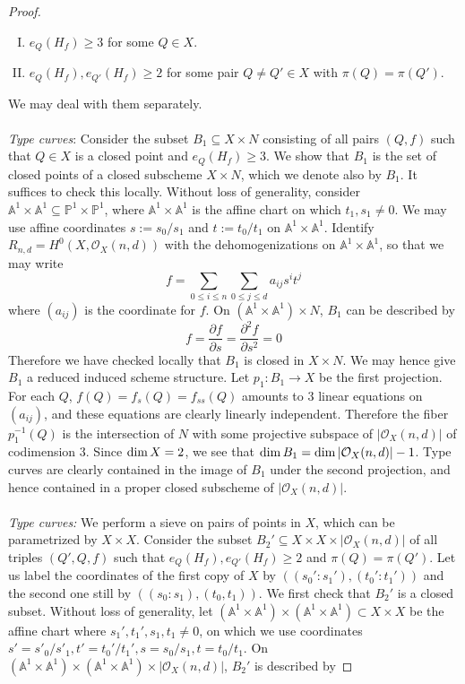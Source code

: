 \documentclass[12pt]{article}
\theoremstyle{plain}
\theoremstyle{definition}
\newcommand{\IA}{\mathbb{A}}
\newcommand{\IP}{\mathbb{P}}
\newcommand{\sO}{\mathcal{O}}
\renewcommand\dim{{\rm dim\,}}
\newcommand{\<}{\langle}
\renewcommand{\>}{\rangle}
\newcommand{\p}{\partial}
\begin{document}
\begin{proof}
\begin{enumerate}[I.]
\item $e_Q(H_f) \ge 3$ for some $Q \in X$. 
\item $e_{Q}(H_f), e_{Q'}(H_f) \ge 2$ for some pair $Q \neq Q' \in X$ with $\pi(Q) = \pi(Q')$. 
\end{enumerate}
We may deal with them separately. \\\\
\textit{Type \uppercase\expandafter{} curves}: Consider the subset $B_1 \subseteq X \times N$ consisting of all pairs $(Q, f)$ such that $Q \in X$ is a closed point and $e_Q(H_f) \ge 3$. We show that $B_1$ is the set of closed points of a closed subscheme $X \times N$, which we denote also by $B_1$. It suffices to check this locally. Without loss of generality, consider $\IA^1 \times \IA^1 \subseteq \IP^1 \times \IP^1$, where $\IA^1 \times \IA^1$ is the affine chart on which $t_1, s_1 \neq 0$. We may use affine coordinates $s := s_0/s_1$ and $t := t_0/t_1$ on $\IA^1 \times \IA^1$. Identify $R_{n, d} = H^0(X, \sO_X(n, d))$ with the dehomogenizations on $\IA^1 \times \IA^1$, so that we may write 
\begin{equation} \label{ident} f = \sum_{0 \le i \le n} \sum_{0 \le j \le d} a_{ij} s^i t^j \end{equation}
where $(a_{ij})$ is the coordinate for $f$. On $(\IA^1 \times \IA^1) \times N$, $B_1$ can be described by 
\begin{equation} f = \frac{\p f}{\p s} = \frac{\p^2 f}{\p s^2} = 0 \end{equation}
Therefore we have checked locally that $B_1$ is closed in $X \times N$. We may hence give $B_1$ a reduced induced scheme structure. Let $p_1 : B_1 \to X$ be the first projection. For each $Q$, $f(Q) = f_s(Q) = f_{ss}(Q)$ amounts to 3 linear equations on $(a_{ij})$, and these equations are clearly linearly independent. Therefore the fiber $p_1^{-1}(Q)$ is the intersection of $N$ with some projective subspace of $|\sO_X(n, d)|$ of codimension $3$. Since $\dim X = 2$, we see that $\dim B_1 = \dim |\sO_X(n, d)| - 1$. Type \uppercase\expandafter{} curves are clearly contained in the image of $B_1$ under the second projection, and hence contained in a proper closed subscheme of $|\sO_X(n, d)|$. \\\\
\textit{Type \uppercase\expandafter{} curves: }We perform a sieve on pairs of points in $X$, which can be parametrized by $X \times X$. Consider the subset $B_2' \subseteq X \times X \times |\sO_X(n, d)|$ of all triples $(Q', Q, f)$ such that $e_{Q}(H_f), e_{Q'}(H_f) \ge 2$ and $\pi(Q) = \pi(Q')$. Let us label the coordinates of the first copy of $X$ by $((s_0' : s_1'), (t_0' : t_1'))$ and the second one still by $((s_0 : s_1), (t_0, t_1))$. We first check that $B_2'$ is a closed subset. Without loss of generality, let $(\IA^1 \times \IA^1) \times (\IA^1 \times \IA^1) \subset X \times X$ be the affine chart where $s_1', t_1', s_1, t_1 \neq 0$, on which we use coordinates $s' = s'_0/s'_1, t' = t_0'/t_1', s = s_0/s_1, t = t_0/t_1$. On $(\IA^1 \times \IA^1) \times (\IA^1 \times \IA^1) \times |\sO_X(n, d)|$, $B_2'$ is described by 

\end{proof}
\end{document}
